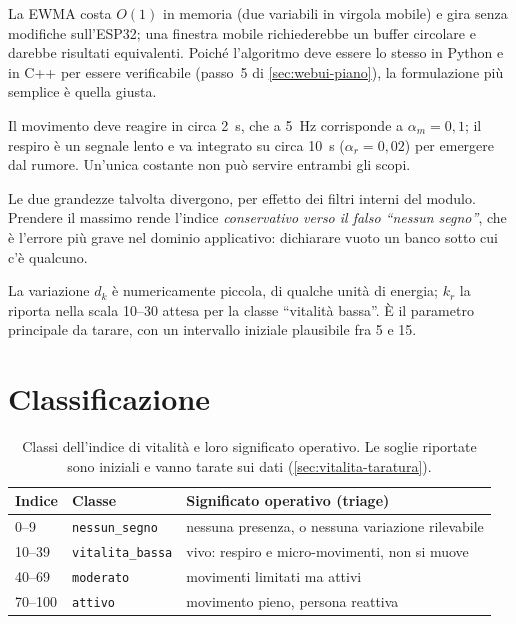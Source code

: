 \begin{description}[leftmargin=1.4em,style=nextline,itemsep=4pt]
  \item[Media esponenziale e non finestra mobile] La EWMA costa $O(1)$ in memoria
    (due variabili in virgola mobile) e gira senza modifiche sull'ESP32; una finestra
    mobile richiederebbe un buffer circolare e darebbe risultati equivalenti. Poiché
    l'algoritmo deve essere lo stesso in Python e in C++ per essere verificabile
    (passo~5 di \cref{sec:webui-piano}), la formulazione più semplice è quella
    giusta.
  \item[Due costanti di tempo diverse] Il movimento deve reagire in circa 2~s, che a
    5~Hz corrisponde a $\alpha_m = 0{,}1$; il respiro è un segnale lento e va
    integrato su circa 10~s ($\alpha_r = 0{,}02$) per emergere dal rumore. Un'unica
    costante non può servire entrambi gli scopi.
  \item[Massimo fra energia del bersaglio e del gate] Le due grandezze talvolta
    divergono, per effetto dei filtri interni del modulo. Prendere il massimo rende
    l'indice \emph{conservativo verso il falso ``nessun segno''}, che è l'errore più
    grave nel dominio applicativo: dichiarare vuoto un banco sotto cui c'è qualcuno.
  \item[Il coefficiente $k_r$] La variazione $d_k$ è numericamente piccola, di
    qualche unità di energia; $k_r$ la riporta nella scala 10--30 attesa per la classe
    ``vitalità bassa''. È il parametro principale da tarare, con un intervallo
    iniziale plausibile fra 5 e 15.
\end{description}

\section{Classificazione}
\label{sec:vitalita-classi}

\begin{table}[htbp]
\centering
\caption{Classi dell'indice di vitalità e loro significato operativo. Le soglie
riportate sono iniziali e vanno tarate sui dati (\cref{sec:vitalita-taratura}).}
\label{tab:vitalita-classi}
\small
\begin{tabularx}{\textwidth}{@{}llX@{}}
\toprule
\textbf{Indice} & \textbf{Classe} & \textbf{Significato operativo (triage)} \\
\midrule
0--9 & \texttt{nessun\_segno} & nessuna presenza, o nessuna variazione rilevabile \\
10--39 & \texttt{vitalita\_bassa} & vivo: respiro e micro-movimenti, non si muove \\
40--69 & \texttt{moderato} & movimenti limitati ma attivi \\
70--100 & \texttt{attivo} & movimento pieno, persona reattiva \\
\bottomrule
\end{tabularx}
\end{table}

